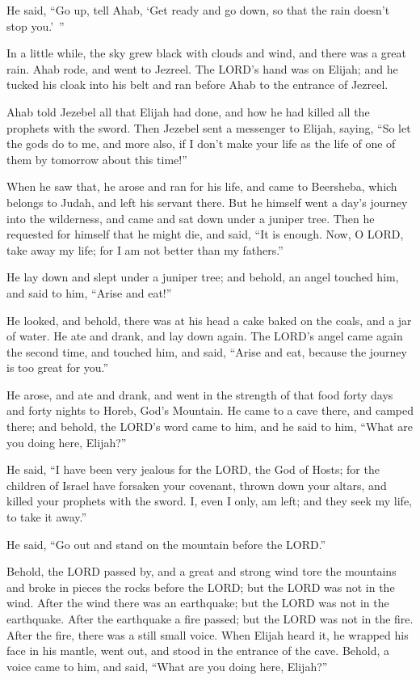 He said, “Go up, tell Ahab, ‘Get ready and go down, so that the rain doesn’t stop you.’ ”

\myverse{}In a little while, the sky grew black with clouds and wind,
and there was a great rain. Ahab rode, and went to Jezreel.
\myverse{}The LORD’s hand was on Elijah; and he tucked his cloak into his belt and
ran before Ahab to the entrance of Jezreel.


\mychapter{} \myverse*{}Ahab told Jezebel all that Elijah had done, and how he had killed
all the prophets with the sword.
\myverse{}Then Jezebel sent a messenger to Elijah, saying, “So let the gods do to me,
and more also, if I don’t make your life as the life of one of them by tomorrow about this time!”

\myverse{}When he saw that, he arose and ran for his life, and came to Beersheba,
which belongs to Judah, and left his servant there.
\myverse{}But he himself went a day’s journey into the wilderness, and came and sat down
under a juniper tree. Then he requested for himself that he might die, and said, “It is enough. Now, O
LORD, take away my life; for I am not better than my fathers.”

\myverse{}He lay down and slept under a juniper tree; and behold, an angel
touched him, and said to him, “Arise and eat!”

\myverse{}He looked, and behold, there was at his head a cake baked on the
coals, and a jar of water. He ate and drank, and lay down again.
\myverse{}The LORD’s angel came again the second time, and touched him, and said, “Arise
and eat, because the journey is too great for you.”

\myverse{}He arose, and ate and drank, and went in the strength of that
food forty days and forty nights to Horeb, God’s Mountain.
\myverse{}He came to a cave there, and camped there; and behold, the LORD’s word came
to him, and he said to him, “What are you doing here, Elijah?”

\myverse{}He said, “I have been very jealous for the LORD, the God of
Hosts; for the children of Israel have forsaken your covenant, thrown down your altars, and killed your
prophets with the sword. I, even I only, am left; and they seek my life, to take it away.”

\myverse{}He said, “Go out and stand on the mountain before the LORD.”

Behold, the LORD passed by, and a great and strong wind tore the mountains and broke in pieces
the rocks before the LORD; but the LORD was not in the wind. After the wind there was an earthquake; but
the LORD was not in the earthquake.
\myverse{}After the earthquake a fire passed; but the LORD was not in the fire. After
the fire, there was a still small voice.
\myverse{}When Elijah heard it, he wrapped his face in his mantle, went out, and stood
in the entrance of the cave. Behold, a voice came to him, and said, “What are you doing here, Elijah?”

